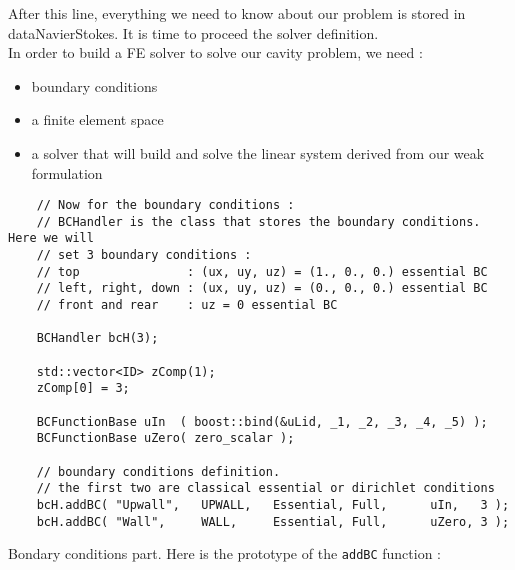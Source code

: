 \noident After this line, everything we need to know about our problem is stored
in dataNavierStokes. It is time to proceed the solver definition. \\

In order to build a FE solver to solve our cavity problem, we need :
\begin{itemize}
\item boundary conditions
\item a finite element space
\item a solver that will build and solve the linear system derived from our weak formulation
\end{itemize}


\begin{verbatim}
    // Now for the boundary conditions :
    // BCHandler is the class that stores the boundary conditions. Here we will
    // set 3 boundary conditions :
    // top               : (ux, uy, uz) = (1., 0., 0.) essential BC
    // left, right, down : (ux, uy, uz) = (0., 0., 0.) essential BC
    // front and rear    : uz = 0 essential BC

    BCHandler bcH(3);

    std::vector<ID> zComp(1);
    zComp[0] = 3;

    BCFunctionBase uIn  ( boost::bind(&uLid, _1, _2, _3, _4, _5) );
    BCFunctionBase uZero( zero_scalar );

    // boundary conditions definition.
    // the first two are classical essential or dirichlet conditions
    bcH.addBC( "Upwall",   UPWALL,   Essential, Full,      uIn,   3 );
    bcH.addBC( "Wall",     WALL,     Essential, Full,      uZero, 3 );
\end{verbatim}

Bondary conditions  part. Here is the prototype of the \verb!addBC! function :

